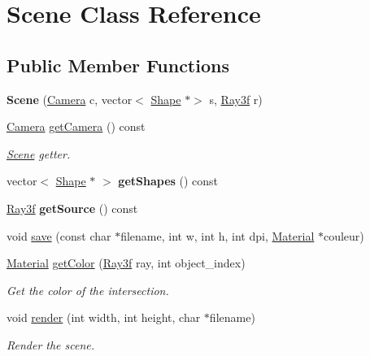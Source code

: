 \hypertarget{class_scene}{}\section{Scene Class Reference}
\label{class_scene}
\subsection*{Public Member Functions}
\begin{DoxyCompactItemize}
\item 
\mbox{\label{class_scene_aa722c9492bc4be765c6d8db718d52f1c}} 
{\bfseries Scene} (\mbox{\hyperlink{class_camera}{Camera}} c, vector$<$ \mbox{\hyperlink{class_shape}{Shape}} $\ast$$>$ s, \mbox{\hyperlink{class_ray3f}{Ray3f}} r)
\item 
\mbox{\label{class_scene_a6d0a3d4d98ee8c259109cdc14e7c5408}} 
\mbox{\hyperlink{class_camera}{Camera}} \mbox{\hyperlink{class_scene_a6d0a3d4d98ee8c259109cdc14e7c5408}{get\+Camera}} () const
\begin{DoxyCompactList}\small\item\em \mbox{\hyperlink{class_scene}{Scene}} getter. \end{DoxyCompactList}\item 
\mbox{\label{class_scene_a04fdbafba14bf53aa5e6a4a492bc7a03}} 
vector$<$ \mbox{\hyperlink{class_shape}{Shape}} $\ast$ $>$ {\bfseries get\+Shapes} () const
\item 
\mbox{\label{class_scene_a242762e0cf02fc62e90b8c2f65c833c5}} 
\mbox{\hyperlink{class_ray3f}{Ray3f}} {\bfseries get\+Source} () const
\item 
void \mbox{\hyperlink{class_scene_a8cc1bb60246aa6e3d8c41d1780d09f7e}{save}} (const char $\ast$filename, int w, int h, int dpi, \mbox{\hyperlink{class_material}{Material}} $\ast$couleur)
\item 
\mbox{\hyperlink{class_material}{Material}} \mbox{\hyperlink{class_scene_a9403e54c505999db1f88ebc722ebfab1}{get\+Color}} (\mbox{\hyperlink{class_ray3f}{Ray3f}} ray, int object\+\_\+index)
\begin{DoxyCompactList}\small\item\em Get the color of the intersection. \end{DoxyCompactList}\item 
void \mbox{\hyperlink{class_scene_a5fd03877e1c4e302c2229bc86d16a23a}{render}} (int width, int height, char $\ast$filename)
\begin{DoxyCompactList}\small\item\em Render the scene. \end{DoxyCompactList}\end{DoxyCompactItemize}


